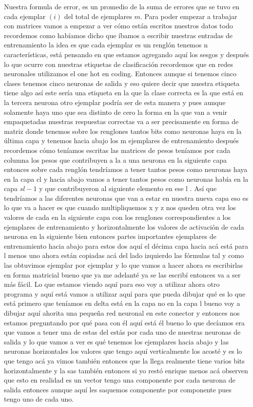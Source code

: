 Nuestra formula de error, es un promedio de la suma de errores que se tuvo en cada ejemplar $(i)$ del total de ejemplares $m$.
Para poder empezar a trabajar con matrices vamos a empezar a ver cómo están escritos nuestros datos todo recordemos como habíamos dicho que íbamos a escribir nuestras entradas de entrenamiento la idea es que cada ejemplar es un renglón tenemos n características, está pensando en que estamos agregando aquí los sesgos y después  lo que ocurre con nuestras etiquetas de clasificación recordemos que en redes neuronales utilizamos el one hot en coding. Entonces aunque si tenemos cinco clases tenemos cinco neuronas de salida y eso quiere decir que nuestra etiqueta tiene algo así este sería una etiqueta en la que la clase correcta es la que está en la tercera neurona otro ejemplar podría ser de esta manera y pues aunque solamente haya uno que sea distinto de cero la forma en la que van a venir empaquetadas nuestras respuestas correctas va a ser precisamente en forma de matriz donde tenemos sobre los renglones tantos bits como neuronas haya en la última capa y tenemos hacia abajo los m ejemplares de entrenamiento después recordemos cómo teníamos escritas las matrices de pesos teníamos por cada columna los pesos que contribuyen a la a una neurona en la siguiente capa entonces sobre cada renglón tendríamos a tener tantos pesos como neuronas haya en la capa cl y hacia abajo vamos a tener tantos pesos como neuronas había en la capa $sl -1$ y que contribuyeron al siguiente elemento en ese l .
Así que tendríamos a las diferentes neuronas que van a estar en nuestra nueva capa eso es lo que va a hacer es que cuando multipliquemos x y z nos queden otra vez los valores de cada en la siguiente capa con los renglones correspondientes a los ejemplares de entrenamiento y horizontalmente los valores de activación de cada neurona en la siguiente bien entonces partes importantes ejemplares de entrenamiento hacia abajo para estos dos aquí el décima capa hacia acá está para l menos uno ahora están copiadas acá del lado izquierdo las fórmulas tal y como las obtuvimos ejemplar por ejemplar y lo que vamos a hacer ahora es escribirlas en forma matricial bueno que ya me adelanté ya se las escribí entonces va a ser más fácil. Lo que estamos viendo aquí para eso voy a utilizar ahora otro programa y aquí está vamos a utilizar aquí para que pueda dibujar qué es lo que está primero que teníamos en delta está en la capa no en la capa l bueno voy a dibujar aquí ahorita una pequeña red neuronal en este conector y entonces nos estamos preguntando por qué pasa con él aquí está él bueno lo que decíamos era que vamos a tener una de estas del estás por cada uno de nuestras neuronas de salida y lo que vamos a ver es qué tenemos los ejemplares hacia abajo y las neuronas horizontales los valores que tengo aquí verticalmente los acosté y es lo que tengo acá ya vimos también entonces que la llega realmente tiene varios bits horizontalmente y la sas también entonces si yo restó enrique menos acá observen que esto en realidad es un vector tengo una componente por cada neurona de salida entonces aunque aquí les saquemos componente por componente pues tengo uno de cada uno. 
